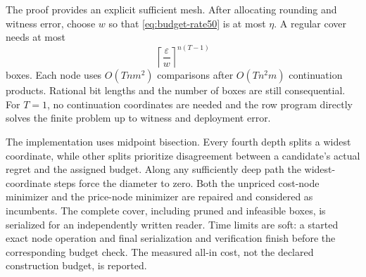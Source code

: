 The proof provides an explicit sufficient mesh. After allocating rounding and witness error, choose $w$ so that \eqref{eq:budget-rate50} is at most $\eta$. A regular cover needs at most
\[
 \left\lceil\frac{\varepsilon}{w}\right\rceil^{n(T-1)}
\]
boxes. Each node uses $O(Tnm^2)$ comparisons after $O(Tn^2m)$ continuation products. Rational bit lengths and the number of boxes are still consequential. For $T=1$, no continuation coordinates are needed and the row program directly solves the finite problem up to witness and deployment error.

The implementation uses midpoint bisection. Every fourth depth splits a widest coordinate, while other splits prioritize disagreement between a candidate's actual regret and the assigned budget. Along any sufficiently deep path the widest-coordinate steps force the diameter to zero. Both the unpriced cost-node minimizer and the price-node minimizer are repaired and considered as incumbents. The complete cover, including pruned and infeasible boxes, is serialized for an independently written reader. Time limits are soft: a started exact node operation and final serialization and verification finish before the corresponding budget check. The measured all-in cost, not the declared construction budget, is reported.
